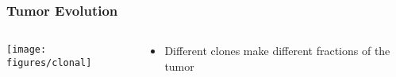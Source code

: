 \begin{frame}
\frametitle{Tumor Evolution}
\begin{columns}
\begin{column}{0.75\textwidth}
\centering
  \texttt{[image: figures/clonal]}
\end{column}
\begin{column}{0.25\textwidth}
\begin{itemize}
\item Different clones make different fractions of the tumor 
\end{itemize}
\end{column}
\end{columns}
\end{frame}


\def\mut#1#2{%
\begin{scope}[shift={#1}]
\node[thick,draw,fill=blue!70,circle, scale=3.5] (#2) {};
\end{scope}
}

\def\muta#1#2{%
\begin{scope}[shift={#1}]
\mut{(0,0)}{#2};
\draw[fill=white] (0,0) circle (.1);
\end{scope}
}

\def\mutb#1#2{%
\begin{scope}[shift={#1}]
\muta{(0,0)}{#2};
\node[fill,color=brown,star, star points=6,scale=0.75] at (45:0.3) {};
\end{scope}
}

\def\mutc#1#2{%
\begin{scope}[shift={#1}]
\muta{(0,0)}{#2};
\node[fill,color=green,regular polygon, regular polygon sides=3,scale=0.65] at (90:0.3) {};
\end{scope}
}

\def\mutd#1#2{%
\begin{scope}[shift={#1}]
\mutc{(0,0)}{#2};
\node[fill,color=red,regular polygon, regular polygon sides=4,scale=0.75] at (0:0.3) {};
\end{scope}
}

\def\mute#1#2{%
\begin{scope}[shift={#1}]
\mutd{(0,0)}{#2};
\node[draw,cross out, draw=pink, very thick,scale=.8] at (180:.3) {};
\end{scope}
}

\def\mutf#1#2{%
\begin{scope}[shift={#1}]
\mutd{(0,0)}{#2};
\node[draw,diamond,scale=0.6, fill,color=blue]  at (270:0.3) {};
\end{scope}
}

